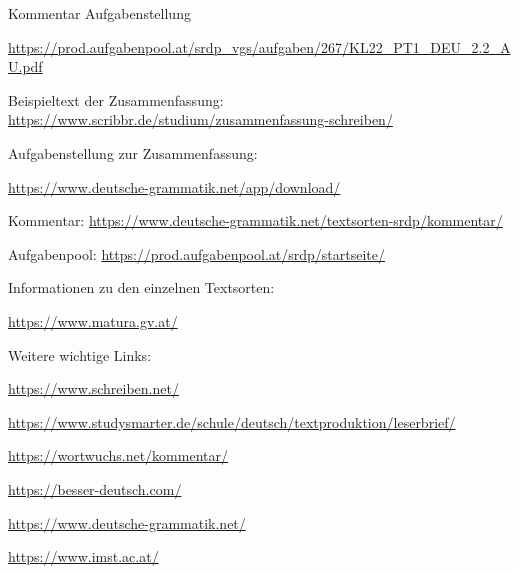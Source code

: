 Kommentar Aufgabenstellung

\href{https://prod.aufgabenpool.at/srdp\_vgs/aufgaben/267/KL22\_PT1\_DEU\_2.2\_AU.pdf}{https://prod.aufgabenpool.at/srdp\_vgs/aufgaben/267/KL22\_PT1\_DEU\_2.2\_AU.pdf}

Beispieltext der Zusammenfassung: \href{https://www.scribbr.de/studium/zusammenfassung-schreiben/}{https://www.scribbr.de/studium/zusammenfassung-schreiben/}

Aufgabenstellung zur Zusammenfassung:

\href{https://www.deutsche-grammatik.net/app/download/19417237025/Zusammenfassung\_Die+junge+Generation+ist+benachteiligt.pdf?t=1666362281 }{https://www.deutsche-grammatik.net/app/download/}

Kommentar: \href{ https://www.deutsche-grammatik.net/textsorten-srdp/kommentar/}{ https://www.deutsche-grammatik.net/textsorten-srdp/kommentar/}

Aufgabenpool: \href{https://prod.aufgabenpool.at/srdp/startseite/}{https://prod.aufgabenpool.at/srdp/startseite/}

Informationen zu den einzelnen Textsorten: 

\href{https://www.matura.gv.at/index.php?eID=dumpFile\&t=f\&f=4525\&token=950c7f2b86f0ebc3459c5f0aa0e04013ab99c572}{https://www.matura.gv.at/}

Weitere wichtige Links:

\href{https://www.schreiben.net/}{https://www.schreiben.net/}

\href{https://www.studysmarter.de/schule/deutsch/textproduktion/leserbrief/ }{https://www.studysmarter.de/schule/deutsch/textproduktion/leserbrief/ }

\href{https://wortwuchs.net/kommentar/ }{https://wortwuchs.net/kommentar/ }

\href{https://besser-deutsch.com/mit-diesen-tipps-gelingt-deine-meinungsrede-bestimmt/#:~:text=Im%20Gegensatz%20zu%20anderen%20Textsorten,keine%20allzu%20komplexen%20Satzstrukturen%20verwenden. }{https://besser-deutsch.com/}

\href{https://www.deutsche-grammatik.net/ }{https://www.deutsche-grammatik.net/ }

\href{https://www.imst.ac.at/imst-wiki/images/f/f2/Rohfassung_hilfe_textkommentare.pdf }{https://www.imst.ac.at/}